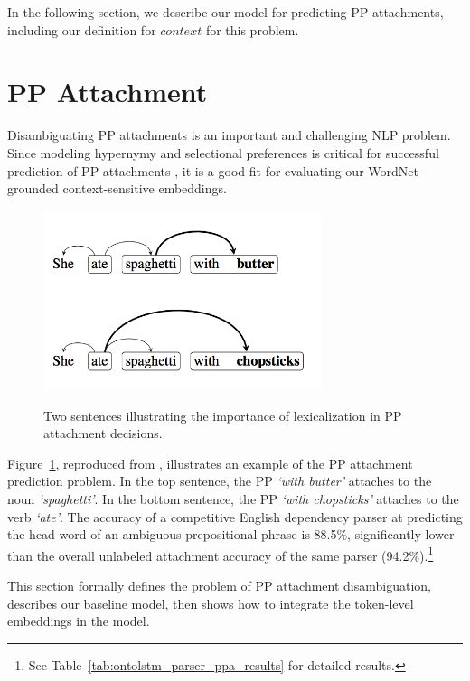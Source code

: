 In the following section, we describe our model for predicting PP attachments, including our definition for $\textit{context}$ for this problem.

\section{PP Attachment}
\label{sec:ontolstm_pp_model}
Disambiguating PP attachments is an important and challenging NLP problem. Since modeling hypernymy and selectional preferences is critical for successful prediction of PP attachments \citep{resnik:93}, it is a good fit for evaluating our WordNet-grounded context-sensitive embeddings.

\begin{figure}[t]
\begin{center}
\includegraphics[width=3.2in]{figures/pp_attachment_example.png}
\label{fig:ontolstm_pp_example}
\caption{Two sentences illustrating the importance
of lexicalization in PP attachment decisions.}
\end{center}
\end{figure}

Figure~\ref{fig:ontolstm_pp_example}, reproduced from \cite{belinkov2014exploring}, illustrates an example of the PP attachment prediction problem.
In the top sentence, the PP \textit{`with butter'} attaches to the noun \textit{`spaghetti'}. 
In the bottom sentence, the PP \textit{`with chopsticks'} attaches to the verb \textit{`ate'}.
The accuracy of a competitive English dependency parser at predicting the head word of an ambiguous prepositional phrase is 88.5\%, significantly lower than the overall unlabeled attachment accuracy of the same parser (94.2\%).\footnote{See Table~\ref{tab:ontolstm_parser_ppa_results} for detailed results.}

This section formally defines the problem of PP attachment disambiguation, describes our baseline model, then shows how to integrate the token-level embeddings in the model.

